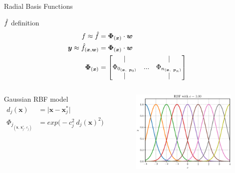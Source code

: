 \begin{frame}{Radial Basis Functions}
    \begin{block}{$\hat{\mathnormal{f}}$ definition}
        \vspace{-0.5cm}
        \begin{align*}
            \mathnormal{f} \approx \hat{\mathnormal{f}} & = \boldsymbol{\Phi}_{(\boldsymbol{x})} \cdot \boldsymbol{w} \\
            \boldsymbol{y} \approx \hat{\mathnormal{f}}_{(\boldsymbol{x}, \boldsymbol{w})} & = \boldsymbol{\Phi}_{(\boldsymbol{x})} \cdot \boldsymbol{w} \\ 
            \boldsymbol{\Phi}_{(\boldsymbol{x})} & = 
            \begin{bmatrix}
                \lvert &  & \lvert \\ 
                \Phi_{0_{ ( \boldsymbol{x}, \ \boldsymbol{p}_0 ) } } & ... & \Phi_{n_{ ( \boldsymbol{x}, \ \boldsymbol{p}_n ) } } \\
                \lvert &  & \lvert 
            \end{bmatrix}
        \end{align*}
    \end{block}
    \vspace{-0.5cm}
    \begin{columns}
        \begin{block}{Gaussian RBF model}
            \vspace{-0.5cm}
            \begin{align*}
                d_j (\boldsymbol{x}) & = \lvert \boldsymbol{x} - \boldsymbol{x}^*_j \lvert \\
                \Phi_{j_{ ( \boldsymbol{x}, \ \boldsymbol{x}^*_j, \ c_j )}} & = exp \big( -c^2_j \ d_j (\boldsymbol{x})^2 \big) 
            \end{align*}
        \end{block}
        \vspace{-0.57cm}
        \begin{figure}
            \centering
            \includegraphics[scale=0.27]{./images/RBF.eps}

\end{figure}
\end{columns}
\end{frame}
